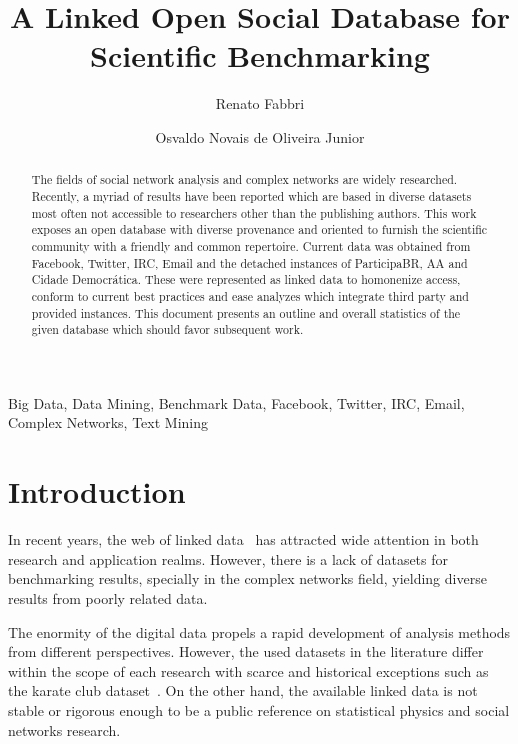 \documentclass[review]{elsarticle}
\begin{document}
%
\begin{frontmatter}
%
\title{A Linked Open Social Database for Scientific Benchmarking}
%
\author[pwr]{Renato Fabbri}
%
\author[pwr]{Osvaldo Novais de Oliveira Junior}
%
\address[pwr]{S\~ao Carlos Institute of Physics, S\~ao Paulo
University, Brazil}
%
%
\begin{abstract}
The fields of social network analysis and complex networks
are widely researched.
Recently, a myriad of results have been reported which are based in
diverse datasets most often not accessible to researchers other than the publishing authors.
This work exposes an open database with diverse provenance and oriented
to furnish the scientific community with a friendly and common repertoire.
Current data was obtained from Facebook, Twitter, IRC, Email and the
detached instances of ParticipaBR, AA and Cidade Democr\'atica.
These were represented as linked data to homonenize access,
conform to current best practices and ease analyzes which integrate third
party and provided instances.
This document presents an outline and overall statistics of the given
database which should favor subsequent work.
\end{abstract}
%
\begin{keyword}
Big Data, Data Mining, Benchmark Data, Facebook, Twitter, IRC, Email,
Complex Networks, Text Mining
\end{keyword}

\end{frontmatter}

\section{Introduction}
In recent years, the web of linked data~\cite{lee1} has attracted wide attention in
both research and application realms.
However, there is a lack of datasets for benchmarking results,
specially in the complex networks field, yielding diverse results from 
poorly related data.

The enormity of the digital data propels a rapid development of analysis methods
from different perspectives.
However, the used datasets in the literature differ within the scope of each research with
scarce and historical exceptions such as the
karate club dataset~\cite{newmanBook}.
On the other hand, the available linked data is not 
stable or rigorous enough to be
a public reference on statistical physics and social networks research.
 
\end{document}

